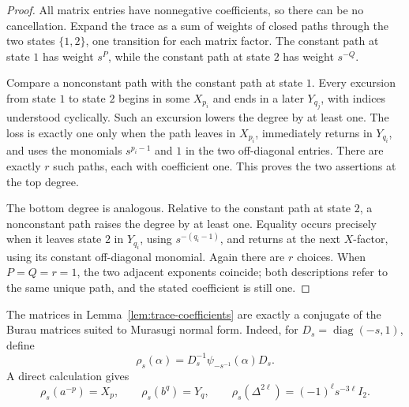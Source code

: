 \documentclass[11pt]{amsart}
\theoremstyle{remark}
\begin{document}
\begin{proof}
All matrix entries have nonnegative coefficients, so there can be no cancellation.
Expand the trace as a sum of weights of closed paths through the two states
\(\{1,2\}\), one transition for each matrix factor.  The constant path at state
\(1\) has weight \(s^P\), while the constant path at state \(2\) has weight
\(s^{-Q}\).

Compare a nonconstant path with the constant path at state \(1\).  Every excursion
from state \(1\) to state \(2\) begins in some \(X_{p_i}\) and ends in a later
\(Y_{q_j}\), with indices understood cyclically.  Such an excursion lowers the
degree by at least one.  The loss is exactly one only when the path leaves in
\(X_{p_i}\), immediately returns in \(Y_{q_i}\), and uses the monomials
\(s^{p_i-1}\) and \(1\) in the two off-diagonal entries.  There are exactly \(r\)
such paths, each with coefficient one.  This proves the two assertions at the top
degree.

The bottom degree is analogous.  Relative to the constant path at state \(2\), a
nonconstant path raises the degree by at least one.  Equality occurs precisely when
it leaves state \(2\) in \(Y_{q_i}\), using \(s^{-(q_i-1)}\), and returns at the next
\(X\)-factor, using its constant off-diagonal monomial.  Again there are \(r\)
choices.  When \(P=Q=r=1\), the two adjacent exponents coincide; both descriptions
refer to the same unique path, and the stated coefficient is still one.
\end{proof}

The matrices in Lemma~\ref{lem:trace-coefficients} are exactly a conjugate of the
Burau matrices suited to Murasugi normal form.  Indeed, for
\(D_s=\operatorname{diag}(-s,1)\), define
\[
  \rho_s(\alpha)=D_s^{-1}\psi_{-s^{-1}}(\alpha)D_s.
\]
A direct calculation gives
\begin{equation}\label{eq:rho}
  \rho_s(a^{-p})=X_p,
  \qquad
  \rho_s(b^q)=Y_q,
  \qquad
  \rho_s(\Delta^{2\ell})=(-1)^\ell s^{-3\ell}I_2.
\end{equation}
\end{document}
